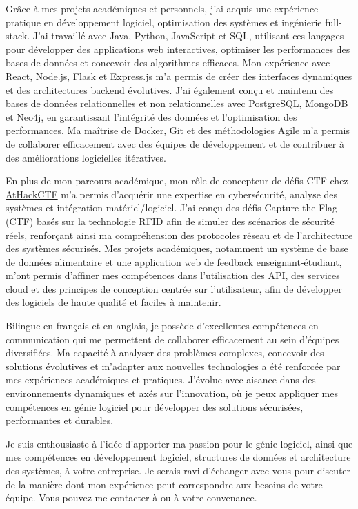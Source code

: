 \documentclass[10pt]{article}
\begin{document}

Grâce à mes projets académiques et personnels, j'ai acquis une expérience pratique en développement logiciel, optimisation des systèmes et ingénierie full-stack. J’ai travaillé avec Java, Python, JavaScript et SQL, utilisant ces langages pour développer des applications web interactives, optimiser les performances des bases de données et concevoir des algorithmes efficaces. Mon expérience avec React, Node.js, Flask et Express.js m'a permis de créer des interfaces dynamiques et des architectures backend évolutives. J’ai également conçu et maintenu des bases de données relationnelles et non relationnelles avec PostgreSQL, MongoDB et Neo4j, en garantissant l’intégrité des données et l’optimisation des performances. Ma maîtrise de Docker, Git et des méthodologies Agile m'a permis de collaborer efficacement avec des équipes de développement et de contribuer à des améliorations logicielles itératives.

En plus de mon parcours académique, mon rôle de concepteur de défis CTF chez \href{https://athackctf.com}{AtHackCTF} m’a permis d’acquérir une expertise en cybersécurité, analyse des systèmes et intégration matériel/logiciel. J’ai conçu des défis Capture the Flag (CTF) basés sur la technologie RFID afin de simuler des scénarios de sécurité réels, renforçant ainsi ma compréhension des protocoles réseau et de l’architecture des systèmes sécurisés. Mes projets académiques, notamment un système de base de données alimentaire et une application web de feedback enseignant-étudiant, m’ont permis d’affiner mes compétences dans l’utilisation des API, des services cloud et des principes de conception centrée sur l’utilisateur, afin de développer des logiciels de haute qualité et faciles à maintenir.

Bilingue en français et en anglais, je possède d'excellentes compétences en communication qui me permettent de collaborer efficacement au sein d’équipes diversifiées. Ma capacité à analyser des problèmes complexes, concevoir des solutions évolutives et m’adapter aux nouvelles technologies a été renforcée par mes expériences académiques et pratiques. J’évolue avec aisance dans des environnements dynamiques et axés sur l’innovation, où je peux appliquer mes compétences en génie logiciel pour développer des solutions sécurisées, performantes et durables.


Je suis enthousiaste à l'idée d'apporter ma passion pour le génie logiciel, ainsi que mes compétences en développement logiciel, structures de données et architecture des systèmes, à votre entreprise. Je serais ravi d’échanger avec vous pour discuter de la manière dont mon expérience peut correspondre aux besoins de votre équipe. Vous pouvez me contacter à \href{tel:+15149445977}{\phone} ou \href{mailto:\email}{\email} à votre convenance.
\end{document}
